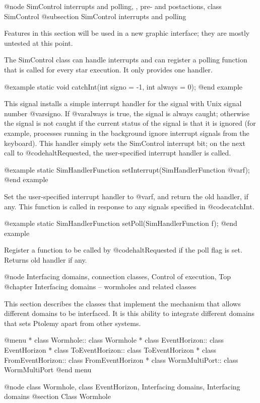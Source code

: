 @node SimControl interrupts and polling,  , pre- and postactions, class SimControl
@subsection SimControl interrupts and polling

Features in this section will be used in a new graphic interface;
they are mostly untested at this point.

The SimControl class can handle interrupts and can register a
polling function that is called for every star execution.
It only provides one handler.

@example
static void catchInt(int signo = -1, int always = 0);
@end example

This signal installs a simple interrupt handler for the signal with
Unix signal number @var{signo}.  If @var{always} is true, the
signal is always caught; otherwise the signal is not caught
if the current status of the signal is that it is ignored
(for example, processes running in the background ignore
interrupt signals from the keyboard).  This handler simply sets
the SimControl interrupt bit; on the next call to @code{haltRequested},
the user-specified interrupt handler is called.

@example
static SimHandlerFunction setInterrupt(SimHandlerFunction @var{f});
@end example

Set the user-specified interrupt handler to @var{f}, and return
the old handler, if any.  This function is called in response to
any signals specified in @code{catchInt}.

@example
static SimHandlerFunction setPoll(SimHandlerFunction f);
@end example

Register a function to be called by @code{haltRequested} if the poll
flag is set.  Returns old handler if any.

@node Interfacing domains, connection classes, Control of execution, Top
@chapter Interfacing domains -- wormholes and related classes

This section describes the classes that implement the mechanism that
allows different domains to be interfaced.  It is this ability to
integrate different domains that sets Ptolemy apart from other systems.

@menu
* class Wormhole::              class Wormhole
* class EventHorizon::          class EventHorizon
* class ToEventHorizon::        class ToEventHorizon
* class FromEventHorizon::      class FromEventHorizon
* class WormMultiPort::         class WormMultiPort
@end menu

@node class Wormhole, class EventHorizon, Interfacing domains, Interfacing domains
@section Class Wormhole

